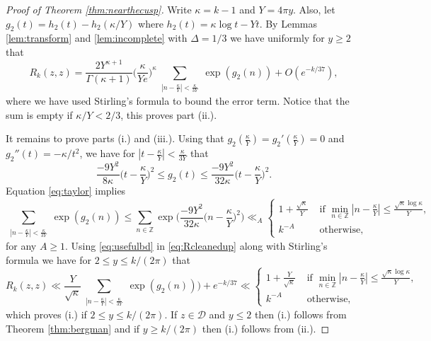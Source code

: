 \documentclass[12pt, a4paper]{amsart}
\theoremstyle{definition}
\newcommand {\1} {\mathbf{1}}
\newcommand {\Dc} {\mathcal{D}}
\numberwithin{equation}{section}
\begin{document}
\begin{proof}[Proof of Theorem \ref{thm:nearthecusp}]
Write $\kappa=k-1$ and $Y=4\pi y$. Also, let $g_2(t)=h_2(t)-h_2(\kappa/Y)$ where $h_2(t)=\kappa \log t-Yt$. By
Lemmas \ref{lem:transform} and \ref{lem:incomplete} with $\Delta=1/3$ we have uniformly for $y \ge 2$
that
\begin{equation} \label{eq:Rcleanedup}
R_k(z,z)=\frac{2Y^{\kappa+1}}{\Gamma(\kappa+1)}\bigg(\frac{\kappa}{Ye}\bigg)^{\kappa}\sum_{\substack{|n-\frac{\kappa}{Y}| < \frac{\kappa}{3Y}}} \exp(g_2(n))+
O(e^{-k/37} ),
\end{equation}
where we have used Stirling's formula to bound the error term.
Notice that the sum is empty if $\kappa /Y<2/3$, this proves part (ii.).

It remains to prove parts (i.) and (iii.).
Using that $g_2(\tfrac{\kappa}{Y})=g_2'(\tfrac{\kappa}{Y})=0$ and $g_2''(t)=-\kappa/t^2$, we have for $|t-\tfrac{\kappa}{Y}| < \tfrac{\kappa}{3Y}$ that
\begin{equation} \label{eq:taylor}
\frac{-9Y^2}{8\kappa}\bigg( t-\frac{\kappa}{Y}\bigg)^2
\le g_2(t) \le \frac{-9Y^2}{32\kappa}\bigg( t-\frac{\kappa}{Y}\bigg)^2 .
\end{equation}
Equation \eqref{eq:taylor} implies 
\begin{equation} \label{eq:usefulbd}
\sum_{\substack{|n-\frac{\kappa}{Y}| < \frac{\kappa}{3Y}}} \exp(g_2(n))
\le \sum_{n \in \mathbb Z}
\exp\bigg( \frac{-9Y^2}{32\kappa}\bigg( n-\frac{\kappa}{Y}\bigg)^2\bigg)  \ll_A
\begin{cases}
1+\frac{\sqrt{\kappa}}{Y} & \text{ if }
\min_{n \in \mathbb Z} | n-\frac{\kappa}{Y}| \le \frac{\sqrt{\kappa} \log \kappa}{Y}, \\
k^{-A} & \text{ otherwise,}
\end{cases}
\end{equation}
for any $A\ge 1$.
Using \eqref{eq:usefulbd} in \eqref{eq:Rcleanedup} along with Stirling's formula we have for $2 \le y \le k/(2\pi)$ that
\[
R_k(z,z) \ll \frac{Y}{\sqrt{\kappa}}\sum_{\substack{|n-\frac{\kappa}{Y}| < \frac{\kappa}{3Y}}} \exp(g_2(n)))+e^{-k/37} \ll \begin{cases}
1+\frac{Y}{\sqrt{\kappa}} & \text{ if }
\min_{n \in \mathbb Z} | n-\frac{\kappa}{Y}| \le \frac{\sqrt{\kappa} \log \kappa}{Y}, \\
k^{-A} & \text{ otherwise,}
\end{cases}
\]
which proves (i.) if $ 2 \le y \le k/(2\pi)$. If $z \in \Dc$ and $y \le 2$ then (i.) follows from Theorem \ref{thm:bergman} and if $y \ge k/(2\pi)$ then (i.) follows from (ii.).



\end{proof}
\end{document}
